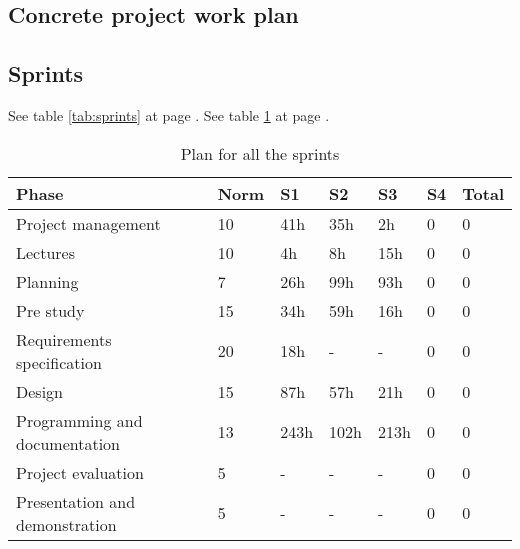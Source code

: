 

\subsection{Concrete project work plan}

\subsection*{Sprints}
See table \ref{tab:sprints} at page \pageref{tab:sprints}.
\newline
\newline
See table \ref{tab:allsprints} at page \pageref{tab:allsprints}.
\begin{table}
\begin{tabular}{l|l|l|l|l|l|l}
\textbf{Phase} &  \textbf{Norm} & \textbf{S1} & \textbf{S2}  & \textbf{S3} & \textbf{S4} & \textbf{Total} \\ \hline \hline
Project management & 10 & 41h & 35h & 2h & 0 & 0\\ \hline
Lectures & 10 & 4h & 8h & 15h & 0 & 0\\ \hline
Planning & 7 & 26h & 99h & 93h & 0 & 0\\ \hline
Pre study & 15 & 34h & 59h & 16h & 0 & 0\\ \hline
Requirements specification & 20 & 18h & - & - & 0 & 0\\ \hline
Design & 15 & 87h & 57h & 21h & 0 & 0\\ \hline
Programming and documentation & 13 & 243h & 102h & 213h & 0 & 0\\ \hline
Project evaluation & 5 & - & - & - & 0 & 0\\ \hline
Presentation and demonstration & 5 & - & - & - & 0 & 0
\end{tabular}
\caption{Plan for all the sprints} \label{tab:allsprints}
\end{table}

